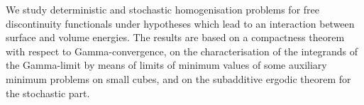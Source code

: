 \mypage
{}
\begin{myabstract}
We study deterministic and stochastic homogenisation problems for free discontinuity functionals under hypotheses which lead to an interaction between surface and volume energies. The results are based on a compactness theorem with respect to Gamma-convergence, on the characterisation of the integrands of the Gamma-limit by means of limits of minimum values of some auxiliary minimum problems on small cubes, and on the subadditive ergodic theorem for the stochastic part.
\end{myabstract}
